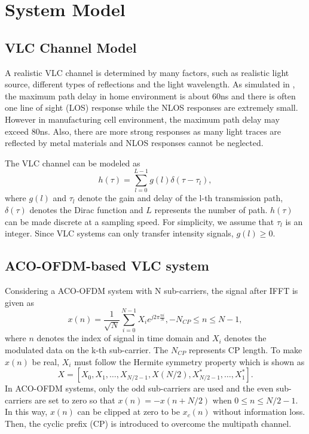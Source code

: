 \documentclass[journal]{IEEEtran}
\begin{document}
\section{System Model}

	\subsection{VLC Channel Model}
		A realistic VLC channel is determined by many factors, such as realistic light source, different types of reflections and the light wavelength. As simulated in \cite{Uysal2015Lifi}, the maximum path delay in home environment is about 60ns and there is often one  line of sight (LOS) response while the NLOS responses are extremely small. However in manufacturing cell environment, the maximum path delay may exceed 80ns. Also, there are more strong  responses as many light traces are reflected by metal materials and NLOS responses cannot be neglected.
		
		The VLC channel can be modeled as
        \begin{equation}\label{channel_model}
          h(\tau)=\sum_{l=0}^{L-1}g(l)\delta(\tau-\tau_l),
        \end{equation}
        where $g(l)$ and $\tau_l$ denote the gain and delay of the l-th transmission path, $\delta(\tau)$ denotes the Dirac function and $L$ represents the number of path.
        $h(\tau)$ can be made discrete at a sampling speed. For simplicity, we assume that $\tau_l$ is an integer.
        Since VLC systems can only transfer intensity signals, $g(l)\geq0$.

    \subsection{ACO-OFDM-based VLC system}
		Considering a ACO-OFDM system with N sub-carriers, the signal after IFFT is given as
		\begin{equation}\label{equ:ACO_OFDM_base}
          x(n)=\frac{1}{\sqrt{N}}\sum_{i=0}^{N-1}X_{i}e^{j2\pi\frac{ni}{N}},-N_{CP}\leq n \leq N-1,
        \end{equation}
        where $n$ denotes the index of signal in time domain and $X_{i}$ denotes the modulated data on the k-th sub-carrier. The $N_{CP}$ represents CP length.
        To make $x(n)$ be real, $X_{i}$ must follow the Hermite symmetry property which is shown as
		\begin{equation}\label{equ:Hermite_symmetry}
          X=[X_0,X_1,\ldots,X_{N/2-1},X(N/2),X_{N/2-1}^{*},\ldots,X_{1}^{*}].
        \end{equation}
		In ACO-OFDM systems, only the odd sub-carriers are used and the even sub-carriers are set to zero so that $ x(n)=-x(n+N/2) $ when $
0\leq n\leq N/2-1 $. In this way, $ x(n) $ can be clipped at zero to be $ x_c(n) $ without information loss. Then, the cyclic prefix (CP) is introduced to overcome the multipath channel.
\end{document}

